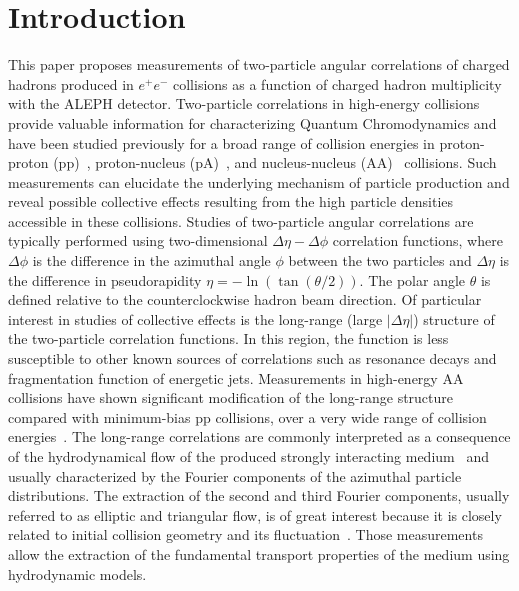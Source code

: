 \documentclass[aps,prl,twocolumn,showpacs,superscriptaddress,groupedaddress]{revtex4}  %
\begin{document}
\pacs{}
\maketitle

\section{\label{sec:introduction}Introduction}
This paper proposes measurements of two-particle angular correlations of charged hadrons produced in $e^+e^-$ collisions as a function of charged hadron multiplicity with the ALEPH detector. Two-particle correlations in high-energy collisions provide valuable information for characterizing Quantum Chromodynamics and have been studied previously for a broad range of collision energies in proton-proton (pp)~\cite{Khachatryan:2010gv}, proton-nucleus (pA)~\cite{CMS:2012qk,Abelev:2012ola,Aad:2012gla}, and nucleus-nucleus (AA)~\cite{Aamodt:2010pa,Chatrchyan:2012wg} collisions. Such measurements can elucidate the underlying mechanism of particle production and reveal possible collective effects resulting from the high particle densities accessible in these collisions.
Studies of two-particle angular correlations are typically performed using two-dimensional $\Delta\eta-\Delta\phi$ correlation functions, where $\Delta\phi$ is the difference in the azimuthal angle $\phi$ between the two particles and $\Delta\eta$ is the difference in pseudorapidity $\eta = -\ln(\tan(\theta/2))$. The polar angle $\theta$ is defined relative to the counterclockwise hadron beam direction.
Of particular interest in studies of collective effects is the long-range (large $|\Delta\eta|$) structure of the two-particle correlation functions. In this region, the function is less susceptible to other known sources of correlations such as resonance decays and fragmentation function of energetic jets. Measurements in high-energy AA collisions have shown significant modification of the long-range structure compared with minimum-bias pp collisions, over a very wide range of collision energies~\cite{Back:2004je,Arsene:2004fa,Adcox:2004mh,Adams:2005dq}. The long-range correlations are commonly interpreted as a consequence of the hydrodynamical flow of the produced strongly interacting medium~\cite{Ollitrault:1992bk} and usually characterized by the Fourier components of the azimuthal particle distributions. The extraction of the second and third Fourier components, usually referred to as elliptic and triangular flow, is of great interest because it is closely related to initial collision geometry and its fluctuation~\cite{Alver:2010gr}. Those measurements allow the extraction of the fundamental transport properties of the medium using hydrodynamic models.
\end{document}
